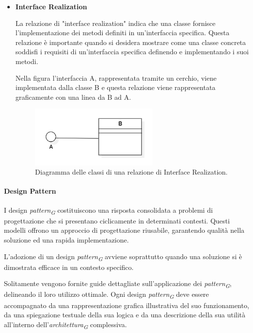 \begin{itemize}
    \item \textbf{Interface Realization}
    
    La relazione di "interface realization" indica che una classe fornisce l'implementazione dei metodi definiti in un'interfaccia specifica. Questa relazione è importante quando si desidera mostrare come una classe concreta soddisfi i requisiti di un'interfaccia specifica definendo e implementando i suoi metodi.

    Nella figura l'interfaccia A, rappresentata tramite un cerchio, viene implementata dalla classe B e questa relazione viene rappresentata graficamente con una linea da B ad A.
    \begin{figure}[H]
        \centering
        \includegraphics[width=0.6\textwidth]{../Images/NormeDiProgetto/InterfaceRealization.PNG}
        \caption{Diagramma delle classi di una relazione di Interface Realization.}
    \end{figure}
\end{itemize}

\paragraph{Design Pattern}
I design \textit{pattern}\textsubscript{\textit{G}} costituiscono una risposta consolidata a problemi di progettazione che si presentano ciclicamente in determinati contesti. Questi modelli offrono un approccio di progettazione riusabile, garantendo qualità nella soluzione ed una rapida implementazione.

L'adozione di un design \textit{pattern}\textsubscript{\textit{G}} avviene soprattutto quando una soluzione si è dimostrata efficace in un contesto specifico.

\vspace{0.2cm}

Solitamente vengono fornite guide dettagliate sull'applicazione dei \textit{pattern}\textsubscript{\textit{G}}, delineando il loro utilizzo ottimale.
Ogni design \textit{pattern}\textsubscript{\textit{G}} deve essere accompagnato da una rappresentazione grafica illustrativa del suo funzionamento, da una spiegazione testuale della sua logica e da una descrizione della sua utilità all'interno dell'\textit{architettura}\textsubscript{\textit{G}} complessiva. 

